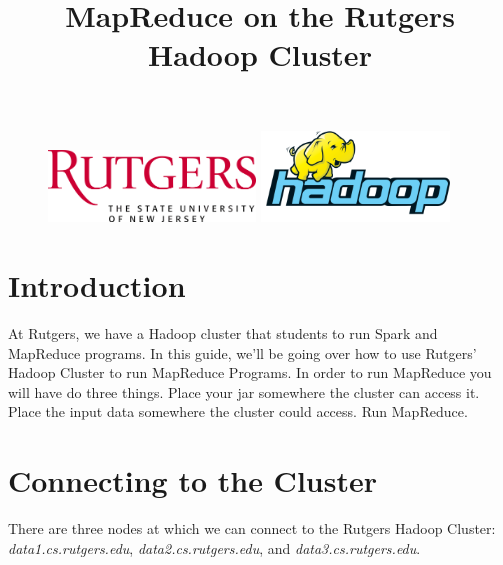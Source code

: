 \documentclass{article}
\title{MapReduce on the Rutgers Hadoop Cluster} %
\date{\vspace{-7ex}}
\begin{document}
\maketitle %


\begin{figure}[h!]
 \centering
 \includegraphics[width=55mm]{images/Rutgers}\hspace{15mm}
 \includegraphics[width=50mm]{images/hadoop}
\end{figure} 


\section*{Introduction} %

At Rutgers, we have a Hadoop cluster that students to run Spark and MapReduce programs. In this guide, we'll be going over how to use Rutgers' Hadoop Cluster to run MapReduce Programs. In order to run MapReduce you will have do three things. Place your jar somewhere the cluster can access it. Place the input data somewhere the cluster could access. Run MapReduce. 



\hypersetup{hidelinks}
\tableofcontents



\section{Connecting to the Cluster}
There are three nodes at which we can connect to the Rutgers Hadoop Cluster: \textit{data1.cs.rutgers.edu}, \textit{data2.cs.rutgers.edu}, and \textit{data3.cs.rutgers.edu}. 
\end{document}
